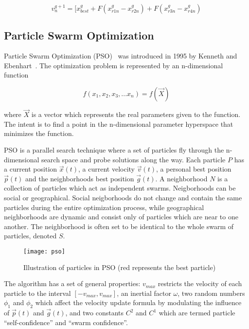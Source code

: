 \begin{equation}
v_{n}^{g+1} = [ x_{best}^{g} + F(x_{r1n}^{g} - x_{r2n}^{g}) + F(x_{r3n}^{g} - x_{r4n}^{g})
\end{equation}

\subsection{Particle Swarm Optimization}

Particle Swarm Optimization (PSO)~\cite{Das2008} was introduced in 1995 by Kenneth and Ebenhart~\cite{eberhart1995new}. The optimization problem is represented by an n-dimensional function

\begin{equation}
  f(x_1,x_2,x_3,...x_n) = f(\vec{X})
\end{equation}

where $\vec{X}$ is a vector which represents the real parameters given to the function. The intent is to find a point in the n-dimensional parameter hyperspace that minimizes the function.

PSO is a parallel search technique where a set of particles  fly through the n-dimensional search space and probe solutions along the way. Each particle $P$ has a current position $\vec{x}(t)$, a current velocity $\vec{v}(t)$, a personal best position $\vec{p}(t)$ and the neighborhoods best position $\vec{g}(t)$. A neighborhood $N$ is a collection of particles which act as independent swarms. Neigborhoods can be social or geographical. Social neigborhoods do not change and contain the same particles during the entire optimization process, while geographical neighborhoods are dynamic and consist only of particles which are near to one another. The neighborhood is often set to be identical to the whole swarm of particles, denoted $S$.

\begin{figure}[H]
  \centering
  \texttt{[image: pso]}
  \caption{Illustration of particles in PSO (red represents the best particle)}
  \label{fig:pso}
\end{figure}

The algorithm has a set of general properties: $v_{max}$ restricts the velocity of each particle to the interval $[-v_{max},v_{max}]$, an inertial factor $\omega$, two random numbers $\phi_1$ and $\phi_2$ which affect the velocity update formula by modulating the influence of $\vec{p}(t)$ and $\vec{g}(t)$, and two constants $C^2$ and $C^1$ which are termed particle “self-confidence” and “swarm confidence”.

